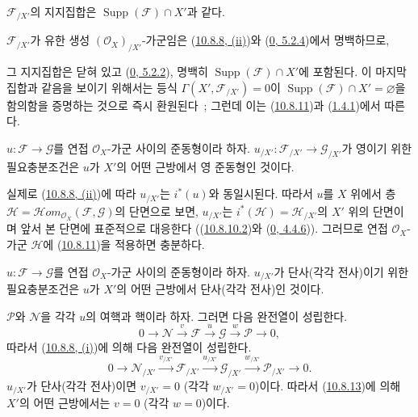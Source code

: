 \begin{corollary}[10.8.12]
\label{I.10.8.12-ko}
$\mathscr{F}_{/X'}$의 지지집합은
$\operatorname{Supp}(\mathscr{F})\cap X'$과 같다.
\end{corollary}

$\mathscr{F}_{/X'}$가 유한 생성 $(\mathscr{O}_X)_{/X'}$-가군임은
(\hyperref[I.10.8.8-ko]{10.8.8, (ii)})와
(\hyperref[0.5.2.4-ko]{0, 5.2.4})에서 명백하므로,


그 지지집합은 닫혀 있고
(\hyperref[0.5.2.2-ko]{0, 5.2.2}), 명백히
$\operatorname{Supp}(\mathscr{F})\cap X'$에 포함된다. 이 마지막
집합과 같음을 보이기 위해서는 등식
$\Gamma(X',\mathscr{F}_{/X'})=0$이
$\operatorname{Supp}(\mathscr{F})\cap X'=\varnothing$을 함의함을
증명하는 것으로 즉시 환원된다~; 그런데 이는
(\hyperref[I.10.8.11-ko]{10.8.11})과
(\hyperref[I.1.4.1-ko]{1.4.1})에서 따른다.

\begin{corollary}[10.8.13]
\label{I.10.8.13-ko}
$u:\mathscr{F}\to\mathscr{G}$를 연접 $\mathscr{O}_X$-가군 사이의 준동형이라
하자. $u_{/X'}:\mathscr{F}_{/X'}\to\mathscr{G}_{/X'}$가 영이기 위한
필요충분조건은 $u$가 $X'$의 어떤 근방에서 영 준동형인 것이다.
\end{corollary}

실제로 (\hyperref[I.10.8.8-ko]{10.8.8, (ii)})에 따라 $u_{/X'}$는
$i^*(u)$와 동일시된다. 따라서 $u$를 $X$ 위에서 층
$\mathscr{H}=\mathscr{H}\!om_{\mathscr{O}_X}(\mathscr{F},\mathscr{G})$의
단면으로 보면, $u_{/X'}$는
$i^*(\mathscr{H})=\mathscr{H}_{/X'}$의 $X'$ 위의 단면이며 앞서 본
단면에 표준적으로 대응한다
((\hyperref[I.10.8.10.2-ko]{10.8.10.2})와
(\hyperref[0.4.4.6-ko]{0, 4.4.6})). 그러므로 연접
$\mathscr{O}_X$-가군 $\mathscr{H}$에
(\hyperref[I.10.8.11-ko]{10.8.11})을 적용하면 충분하다.

\begin{corollary}[10.8.14]
\label{I.10.8.14-ko}
$u:\mathscr{F}\to\mathscr{G}$를 연접 $\mathscr{O}_X$-가군 사이의
준동형이라 하자. $u_{/X'}$가 단사(각각 전사)이기 위한 필요충분조건은
$u$가 $X'$의 어떤 근방에서 단사(각각 전사)인 것이다.
\end{corollary}

$\mathscr{P}$와 $\mathscr{N}$을 각각 $u$의 여핵과 핵이라 하자.
그러면 다음 완전열이 성립한다.
\[
  0\to\mathscr{N}\xrightarrow{v}\mathscr{F}\xrightarrow{u}
  \mathscr{G}\xrightarrow{w}\mathscr{P}\to0,
\]
따라서 (\hyperref[I.10.8.8-ko]{10.8.8, (i)})에 의해 다음 완전열이
성립한다.
\[
  0\to\mathscr{N}_{/X'}\xrightarrow{v_{/X'}}
  \mathscr{F}_{/X'}\xrightarrow{u_{/X'}}
  \mathscr{G}_{/X'}\xrightarrow{w_{/X'}}
  \mathscr{P}_{/X'}\to0.
\]
$u_{/X'}$가 단사(각각 전사)이면 $v_{/X'}=0$ (각각
$w_{/X'}=0$)이다. 따라서 (\hyperref[I.10.8.13-ko]{10.8.13})에 의해
$X'$의 어떤 근방에서는 $v=0$ (각각 $w=0$)이다.


